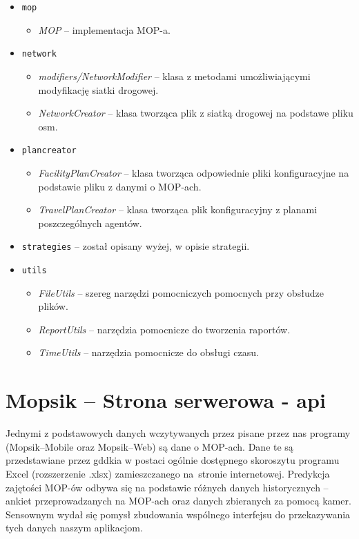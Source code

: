\begin{itemize}
\begin{itemize}
        \end{itemize}
    \item \texttt{mop}
        \begin{itemize}
            \item \textit{MOP} -- implementacja MOP-a.
        \end{itemize}
    \item \texttt{network}
        \begin{itemize}
            \item \textit{modifiers/NetworkModifier} -- klasa z metodami umożliwiającymi modyfikację siatki drogowej.
            \item \textit{NetworkCreator} -- klasa tworząca plik z siatką drogowej na podstawe pliku osm.
        \end{itemize}
    \item \texttt{plancreator}
        \begin{itemize}
            \item \textit{FacilityPlanCreator} -- klasa tworząca odpowiednie pliki konfiguracyjne na podstawie pliku z danymi o MOP-ach.
            \item \textit{TravelPlanCreator} -- klasa tworząca plik konfiguracyjny z planami poszczególnych agentów.
        \end{itemize}
    \item \texttt{strategies} -- został opisany wyżej, w opisie strategii.
    \item \texttt{utils}
        \begin{itemize}
            \item \textit{FileUtils} -- szereg narzędzi pomocniczych pomocnych przy obsłudze plików.
            \item \textit{ReportUtils} -- narzędzia pomocnicze do tworzenia raportów.
            \item \textit{TimeUtils} -- narzędzia pomocnicze do obsługi czasu.
        \end{itemize}        
    
\end{itemize}
\chapter{Mopsik -- Strona serwerowa - \acrshort{api}}\label{r:apka} 

Jednymi z podstawowych danych wczytywanych przez pisane przez nas programy (Mopsik--Mobile oraz Mopsik--Web) są dane o MOP-ach. Dane te są przedstawiane przez \acrshort{gddkia} w postaci ogólnie dostępnego skoroszytu programu Excel (rozszerzenie .xlsx) zamieszczanego na~stronie internetowej.
Predykcja zajętości MOP-ów odbywa się na podstawie różnych danych historycznych -- ankiet przeprowadzanych na MOP-ach oraz danych zbieranych za pomocą kamer.
Sensownym wydał się pomysł zbudowania wspólnego interfejsu do przekazywania tych danych naszym aplikacjom. 

